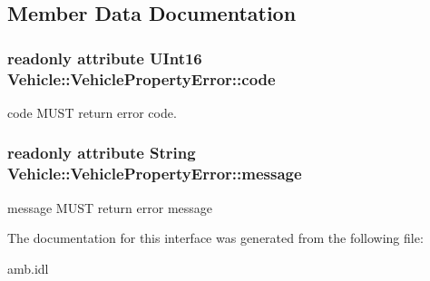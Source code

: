 \subsection{Member Data Documentation}
\hypertarget{interfaceVehicle_1_1VehiclePropertyError_a407fb4d4577a87e75a5436e8e712d972}{
\subsubsection[{code}]{\setlength{\rightskip}{0pt plus 5cm}readonly attribute U\-Int16 Vehicle\-::\-Vehicle\-Property\-Error\-::code}}\label{interfaceVehicle_1_1VehiclePropertyError_a407fb4d4577a87e75a5436e8e712d972}
code M\-U\-S\-T return error code. \hypertarget{interfaceVehicle_1_1VehiclePropertyError_a67b42d05a341b9bf448776b71b958e7b}{
\subsubsection[{message}]{\setlength{\rightskip}{0pt plus 5cm}readonly attribute String Vehicle\-::\-Vehicle\-Property\-Error\-::message}}\label{interfaceVehicle_1_1VehiclePropertyError_a67b42d05a341b9bf448776b71b958e7b}
message M\-U\-S\-T return error message 

The documentation for this interface was generated from the following file\-:\begin{DoxyCompactItemize}
\item 
amb.\-idl\end{DoxyCompactItemize}
